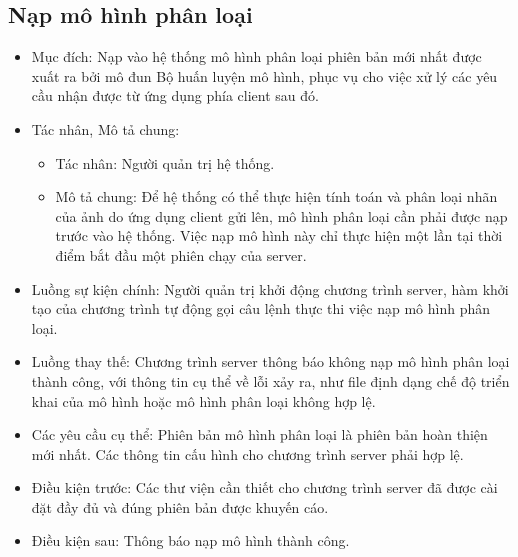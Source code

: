 \subsection{Nạp mô hình phân loại}
\begin{itemize}
	\item Mục đích: Nạp vào hệ thống mô hình phân loại phiên bản mới nhất được xuất ra bởi mô đun Bộ huấn luyện mô hình, phục vụ cho việc xử lý các yêu cầu nhận được từ ứng dụng phía client sau đó.
	\item Tác nhân, Mô tả chung:
	\begin{itemize}
		\item Tác nhân: Người quản trị hệ thống.
		\item Mô tả chung: Để hệ thống có thể thực hiện tính toán và phân loại nhãn của ảnh do ứng dụng client gửi lên, mô hình phân loại cần phải	được nạp trước vào hệ thống. Việc nạp mô hình này chỉ thực hiện một lần tại thời điểm bắt đầu một phiên chạy của server.
	\end{itemize}
	\item Luồng sự kiện chính: Người quản trị khởi động chương trình server, hàm khởi tạo của chương trình tự động gọi câu lệnh thực thi việc nạp mô hình phân loại.
	\item Luồng thay thế: Chương trình server thông báo không nạp mô hình phân loại	thành công, với thông tin cụ thể về lỗi xảy ra, như file định dạng chế độ triển khai của mô hình hoặc mô hình phân loại không hợp lệ.
	\item Các yêu cầu cụ thể: Phiên bản mô hình phân loại là phiên bản hoàn thiện mới nhất. Các thông tin cấu hình cho chương trình server phải hợp lệ.
	\item Điều kiện trước: Các thư viện cần thiết cho chương trình server đã được cài đặt đầy đủ và đúng phiên bản được khuyến cáo.
	\item Điều kiện sau: Thông báo nạp mô hình thành công.
\end{itemize}

